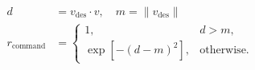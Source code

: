 \documentclass[border=7pt]{standalone}
\begin{document}
\color{ink}
$\displaystyle \begin{aligned}d&=v_{\mathrm{des}}\cdot v,\quad m=\lVert v_{\mathrm{des}}\rVert\\r_{\mathrm{command}}&=\begin{cases}1,&d>m,\\\exp[-(d-m)^2],&\text{otherwise}.\end{cases}\end{aligned}$
\end{document}
